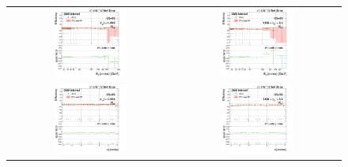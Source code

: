 \begin{figure}[bh]
  \begin{center}
    \begin{tabular}{cc}
      \includegraphics[width=0.45\textwidth]{figures/Zprime/2017/ScaleFactor/SameSign/N-1/g_compare_cut_Et_Barrel_ea_ta_inc_AS_N_1_Dxy_PUW.png} &
      \includegraphics[width=0.45\textwidth]{figures/Zprime/2017/ScaleFactor/SameSign/N-1/g_compare_cut_Et_Endcap_ea_ta_inc_AS_N_1_Dxy_PUW.png} \\
      \includegraphics[width=0.45\textwidth]{figures/Zprime/2017/ScaleFactor/SameSign/N-1/g_compare_cut_phi_Barrel_ea_ta_inc_AS_N_1_Dxy_PUW.png} &
      \includegraphics[width=0.45\textwidth]{figures/Zprime/2017/ScaleFactor/SameSign/N-1/g_compare_cut_phi_Endcap_ea_ta_inc_AS_N_1_Dxy_PUW.png} \\

\end{tabular}
\end{center}
\end{figure}
